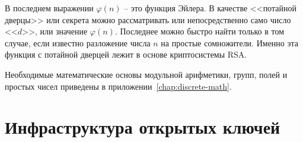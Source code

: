 В последнем выражении $\varphi \left( n \right)$ -- это функция Эйлера. В качестве <<потайной дверцы>> или секрета можно рассматривать или непосредственно само число <<$d$>>, или значение $\varphi \left( n \right)$. Последнее можно быстро найти только в том случае, если известно разложение числа $n$ на простые сомножители. Именно эта функция с потайной дверцей лежит в основе криптосистемы RSA.

Необходимые математические основы модульной арифметики, групп, полей и простых чисел приведены в приложении~\ref{chap:discrete-math}.









\section{Инфраструктура открытых ключей}\label{chapter-public-key-infrastructure}




